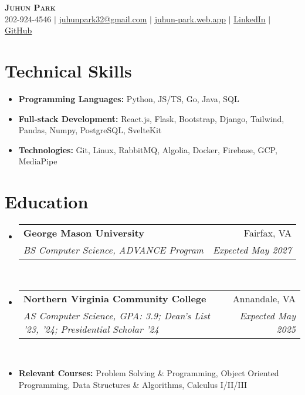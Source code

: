 \documentclass[letterpaper,11pt]{article}
\makeatletter
\newcommand{\resumeItem}[1]{
  \item\small{
    {#1 \vspace{0pt}}
  }
}
\newcommand{\resumeItemThin}[1]{
  \item\small{
    {#1 \vspace{-5pt}}
  }
}
\newcommand{\resumeSubheading}[4]{
    \item
    \begin{tabular*}{0.985\textwidth}[t]{l@{\extracolsep{\fill}}r@{\hspace{-0.1in}}}
        \small{\textbf{#1}} & \small{#2} \\
        \textit{\small#3} & \textit{\small #4} \\
    \end{tabular*}\vspace{-6pt}
}
\newcommand{\resumeSubHeadingListStart}{\begin{itemize}[leftmargin=0.00in, rightmargin=-0.2in, label={}]\vspace{1pt}}
\newcommand{\resumeSubHeadingListEnd}{\end{itemize}\vspace{-10pt}}
\newcommand{\resumeItemListStart}{\begin{itemize}[leftmargin=0.15in, rightmargin=0.15in]}
\newcommand{\resumeItemListEnd}{\end{itemize}\vspace{-5pt}}
\makeatother
\begin{document}

\begin{center}
  \textbf{\Huge \scshape {Juhun Park}} \\ \vspace{1pt}
  \small 202-924-4546 $|$
  \href{mailto:riann3207@gmail.com}{\underline{juhunpark32@gmail.com}} $|$
  \href{https://juhun-park.web.app/}{\underline{juhun-park.web.app}} $|$
  \href{https://linkedin.com/in/juhun-park}{\underline{LinkedIn}} $|$
  \href{https://github.com/juhun32}{\underline{GitHub}} \\
\end{center}

\vspace{-7pt}


\section{Technical Skills}
\vspace{5pt}
\resumeItemListStart
\resumeItemThin{\textbf{Programming Languages: }{Python, JS/TS, Go, Java, SQL}}\\
\resumeItemThin{\textbf{Full-stack Development: }{React.js, Flask, Bootstrap, Django, Tailwind, Pandas, Numpy, PostgreSQL, SvelteKit}}\\
\resumeItemThin{\textbf{Technologies: }{Git, Linux, RabbitMQ, Algolia, Docker, Firebase, GCP, MediaPipe}}\\
\resumeItemListEnd


\section{Education}
\resumeSubHeadingListStart
\resumeSubheading
{George Mason University}{Fairfax, VA}
{BS Computer Science, ADVANCE Program}{Expected May 2027}\\

\resumeSubheading
{Northern Virginia Community College}{Annandale, VA}
{AS Computer Science, GPA: 3.9; Dean's List '23, '24; Presidential Scholar '24}{Expected May 2025} \\

\resumeItem{\textbf{Relevant Courses: }{Problem Solving \& Programming, Object Oriented Programming, Data Structures \& Algorithms, Calculus I/II/III}}
\resumeSubHeadingListEnd

\end{document}
